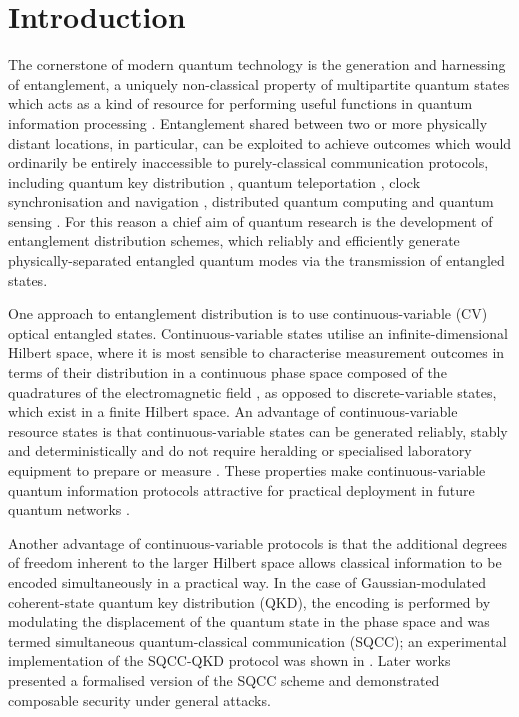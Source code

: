 \documentclass[%
 reprint,
 superscriptaddress,
 amsmath,
 amssymb,
 aps,
 pra,
]{revtex4-2}
\begin{document}
\section{Introduction} \label{sec:intro}
The cornerstone of modern quantum technology is the generation and harnessing of entanglement, a uniquely non-classical property of multipartite quantum states which acts as a kind of resource for performing useful functions in quantum information processing \cite{nielsen_quantum_2010}. Entanglement shared between two or more physically distant locations, in particular, can be exploited to achieve outcomes which would ordinarily be entirely inaccessible to purely-classical communication protocols, including quantum key distribution \cite{bennett_quantum_2014, ekert_quantum_1991, gisin_quantum_2002, ralph_continuous_1999, grosshans_quantum_2003}, quantum teleportation \cite{bennett_teleporting_1993, bennett_purification_1996, braunstein_criteria_2000}, clock synchronisation and navigation \cite{jozsa_quantum_2000, yurtsever_lorentz-invariant_2002, komar_quantum_2014, ilo-okeke_remote_2018}, distributed quantum computing \cite{cirac_distributed_1999} and quantum sensing \cite{gottesman_longer-baseline_2012, degen_quantum_2017, zhuang_distributed_2018, xia_repeater-enhanced_2019}. For this reason a chief aim of quantum research is the development of entanglement distribution schemes, which reliably and efficiently generate physically-separated entangled quantum modes via the transmission of entangled states.

One approach to entanglement distribution is to use continuous-variable (CV) optical entangled states. Continuous-variable states utilise an infinite-dimensional Hilbert space, where it is most sensible to characterise measurement outcomes in terms of their distribution in a continuous phase space composed of the quadratures of the electromagnetic field \cite{walls_quantum_2008,gerry_introductory_2004}, as opposed to discrete-variable states, which exist in a finite Hilbert space. An advantage of continuous-variable resource states is that continuous-variable states can be generated reliably, stably and deterministically and do not require heralding or specialised laboratory equipment to prepare or measure \cite{bachor_guide_2019}. These properties make continuous-variable quantum information protocols attractive for practical deployment in future quantum networks \cite{usenko_continuous-variable_2025}.

Another advantage of continuous-variable protocols is that the additional degrees of freedom inherent to the larger Hilbert space allows classical information to be encoded simultaneously in a practical way. In the case of Gaussian-modulated coherent-state quantum key distribution (QKD), the encoding is performed by modulating the displacement of the quantum state in the phase space \cite{qi_simultaneous_2016, qi_noise_2018} and was termed simultaneous quantum-classical communication (SQCC); an experimental implementation of the SQCC-QKD protocol was shown in \cite{kumar_experimental_2019}. Later works \cite{zaunders_enhanced_2025} presented a formalised version of the SQCC scheme and demonstrated composable security under general attacks.
\end{document}
